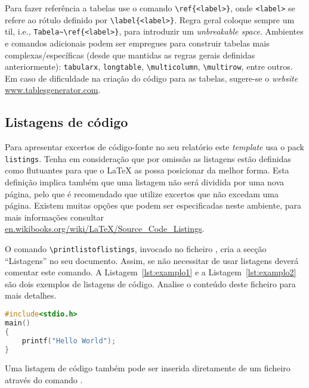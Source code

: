 Para fazer referência a tabelas use o comando \verb|\ref{<label>}|, onde  \verb|<label>| se refere ao rótulo definido por \verb|\label{<label>}|. Regra geral coloque sempre um til, i.e., \verb|Tabela~\ref{<label>}|, para introduzir um \textit{unbreakable space}. Ambientes e comandos adicionais podem ser empregues para construir tabelas mais complexas/específicas (desde que mantidas as regras gerais definidas anteriormente): \verb|tabularx|, \verb|longtable|, \verb|\multicolumn|, \verb|\multirow|, entre outros. Em caso de dificuldade na criação do código para as tabelas, sugere-se o \textit{website} \url{www.tablesgenerator.com}.


\subsection{Listagens de código}

Para apresentar excertos de código-fonte no seu relatório este \textit{template} usa o \gls{pack} \verb|listings|. Tenha em consideração que por omissão as listagens estão definidas como flutuantes para que o \LaTeX{} as possa posicionar da melhor forma. Esta definição implica também que uma listagem não será dividida por uma nova página, pelo que é recomendado que utilize excertos que não excedam uma página. Existem muitas opções que podem ser especificadas neste ambiente, para mais informações consultar \url{en.wikibooks.org/wiki/LaTeX/Source_Code_Listings}.

O comando \verb|\printlistoflistings|, invocado no ficheiro , cria a secção ``Listagens'' no seu documento. Assim, se não necessitar de usar listagens deverá comentar este comando. A Listagem~\ref{lst:examplo1} e a Listagem~\ref{lst:examplo2} são dois exemplos de listagens de código. Analise o conteúdo deste ficheiro para mais detalhes.

\begin{center}
\begin{minipage}{0.7\linewidth}
\begin{lstlisting}[language=C, caption=Exemplo simples de C., label=lst:examplo1]
#include<stdio.h>
main()
{
	printf("Hello World");
}
\end{lstlisting}
\end{minipage}
\end{center}

Uma listagem de código também pode ser inserida diretamente de um ficheiro através do comando \verb||.

